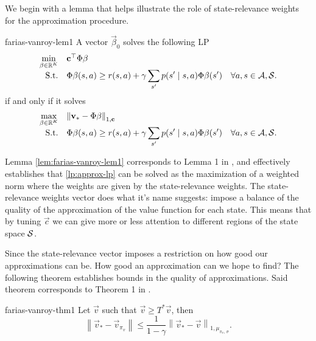 We begin with a lemma that helps illustrate the role of state-relevance weights
for the approximation procedure.

\begin{lemma}{}{farias-vanroy-lem1}
    A vector $\vec{\beta}_0$ solves the following LP
    \begin{equation*}
    \begin{array}{rl@{}ll}
        \displaystyle \min_{\vec{\beta} \in \R^{K}} & \vec{c}^{\top} \Phi \vec{\beta} \\
        \text{S.t.} & \displaystyle \Phi \vec{\beta} (s, a) \geq r(s, a) + \gamma \sum_{s'} p(s' \mid s, a) \Phi \vec{\beta}(s') & \quad \forall a, s \in \Actions, \States . \\
    \end{array}
    \end{equation*}
    if and only if it solves
    \begin{equation*}
    \begin{array}{rl@{}ll}
        \displaystyle \max_{\vec{\beta} \in \R^{K}} & \left\| \vec{v}_* - \Phi \vec{\beta} \right\|_{1, \vec{c}} \\
        \text{S.t.} & \displaystyle \Phi \vec{\beta} (s, a) \geq r(s, a) + \gamma \sum_{s'} p(s' \mid s, a) \Phi \vec{\beta}(s') & \quad \forall a, s \in \Actions, \States . \\
    \end{array}
    \end{equation*}
\end{lemma}

Lemma \ref{lem:farias-vanroy-lem1} corresponds to Lemma 1 in
\Cite[pg.~853]{farias2003LP2ADP}, and effectively establishes that
\eqref{lp:approx-lp} can be solved as the maximization of a weighted norm where
the weights are given by the state-relevance weights. The state-relevance
weights vector does what it's name suggests: impose a balance of the quality of
the approximation of the value function for each state. This means that by
tuning $\vec{c}$ we can give more or less attention to different regions of the
state space $\mathcal{S}$.

Since the state-relevance vector imposes a restriction on how good our
approximations can be. How good an approximation can we hope to find? The
following theorem establishes bounds in the quality of approximations. Said
theorem corresponds to Theorem 1 in \Cite[pg.~853]{farias2003LP2ADP}.

\begin{thrm}{}{farias-vanroy-thm1}
    Let $\vec{v}$ such that $\vec{v} \geq T^{*} \vec{v}$, then
    \begin{equation*}
       \left\| \vec{v}_{*} - \vec{v}_{\pi_v} \right\| \leq \frac{1}{1 - \gamma} \left\| \vec{v}_{*} - \vec{v} \right\|_{1, \mu_{\pi_v, \, \sigma}}.
    \end{equation*}
\end{thrm}

